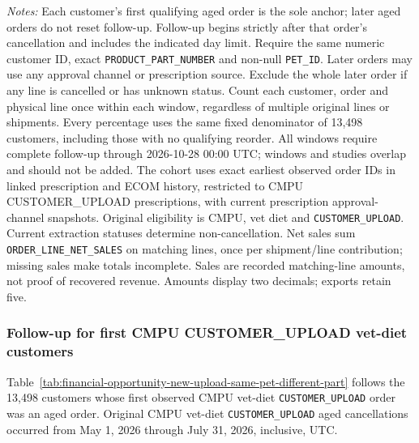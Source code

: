 \begin{table}[!htbp]
\begin{minipage}{\linewidth}
\footnotesize
\textit{Notes:} Each customer's first qualifying aged order is the sole anchor;
later aged orders do not reset follow-up. Follow-up begins strictly after that
order's cancellation and includes the indicated day limit. Require the same
numeric customer ID, exact \texttt{PRODUCT\_PART\_NUMBER} and non-null
\texttt{PET\_ID}. Later orders may use any approval channel or prescription
source. Exclude the whole later order if any line is cancelled or has unknown
status. Count each customer, order and physical line once within each window,
regardless of multiple original lines or shipments. Every percentage uses the
same fixed denominator of 13,498 customers, including those with no
qualifying reorder. All windows require complete follow-up through
2026-10-28 00:00 UTC; windows and studies overlap and should not be added.
The cohort uses exact earliest observed order IDs in linked prescription and
ECOM history, restricted to CMPU CUSTOMER\_UPLOAD prescriptions, with current
prescription approval-channel snapshots. Original eligibility is CMPU,
vet diet and \texttt{CUSTOMER\_UPLOAD}. Current extraction statuses determine
non-cancellation. Net sales sum \texttt{ORDER\_LINE\_NET\_SALES} on matching
lines, once per shipment/line contribution; missing sales make totals incomplete.
Sales are recorded matching-line amounts, not proof of recovered revenue.
Amounts display two decimals; exports retain five.
\end{minipage}
\end{table}

\clearpage
\subsubsection{Follow-up for first CMPU CUSTOMER\_UPLOAD vet-diet customers}
Table~\ref{tab:financial-opportunity-new-upload-same-pet-different-part} follows the
13,498 customers whose first observed CMPU vet-diet
\texttt{CUSTOMER\_UPLOAD} order was an aged order. Original CMPU vet-diet
\texttt{CUSTOMER\_UPLOAD} aged cancellations occurred from
May 1, 2026 through July 31, 2026, inclusive, UTC.

